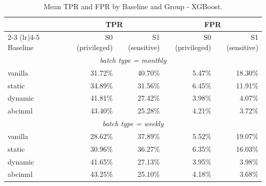 \begin{table}
  \caption{Mean TPR and FPR by Baseline and Group - XGBoost.}
  \label{tab:absolute-rates-xgboost}
  \begin{tabular}{lrrrr}
    \toprule
     & \multicolumn{2}{c}{TPR} & \multicolumn{2}{c}{FPR} \\
    \cmidrule(lr){2-3} \cmidrule(lr){4-5}
    Baseline & S0 (privileged) & S1 (sensitive) & S0 (privileged) & S1 (sensitive) \\
    \midrule
    \multicolumn{5}{c}{\textit{batch type = monthly}} \\
    \midrule
    vanilla & 31.72\% & 40.70\% & 5.47\% & 18.30\% \\
    static & 34.89\% & 31.56\% & 6.45\% & 11.91\% \\
    dynamic & 41.81\% & 27.42\% & 3.98\% & 4.07\% \\
    abcinml & 43.40\% & 25.28\% & 4.21\% & 3.72\% \\
    \midrule
    \multicolumn{5}{c}{\textit{batch type = weekly}} \\
    \midrule
    vanilla & 28.62\% & 37.89\% & 5.52\% & 19.07\% \\
    static & 30.96\% & 36.27\% & 6.35\% & 16.03\% \\
    dynamic & 41.65\% & 27.13\% & 3.95\% & 3.98\% \\
    abcinml & 43.25\% & 25.10\% & 4.18\% & 3.68\% \\
    \bottomrule
  \end{tabular}
\end{table}
